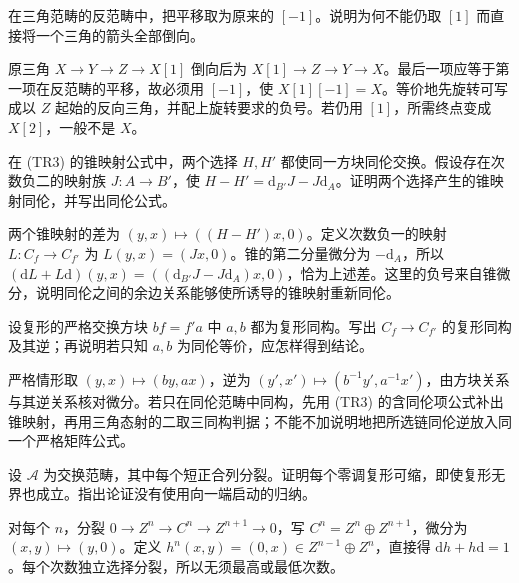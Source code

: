 \begin{exercise}\label{b4:ex:16-opposite-shift}
在三角范畴的反范畴中，把平移取为原来的 \([-1]\)。说明为何不能仍取 \([1]\) 而直接将一个三角的箭头全部倒向。
\end{exercise}
\begin{solution}
原三角 \(X\to Y\to Z\to X[1]\) 倒向后为 \(X[1]\to Z\to Y\to X\)。最后一项应等于第一项在反范畴的平移，故必须用 \([-1]\)，使 \(X[1][-1]=X\)。等价地先旋转可写成以 \(Z\) 起始的反向三角，并配上旋转要求的负号。若仍用 \([1]\)，所需终点变成 \(X[2]\)，一般不是 \(X\)。
\end{solution}

\begin{exercise}\label{b4:ex:16-different-homotopies}
在 (TR3) 的锥映射公式中，两个选择 \(H,H'\) 都使同一方块同伦交换。假设存在次数负二的映射族 \(J:A\to B'\)，使 \(H-H'=\mathrm{d}_{B'}J-J\mathrm{d}_A\)。证明两个选择产生的锥映射同伦，并写出同伦公式。
\end{exercise}
\begin{solution}
两个锥映射的差为 \((y,x)\mapsto((H-H')x,0)\)。定义次数负一的映射 \(L:C_f\to C_{f'}\) 为 \(L(y,x)=(Jx,0)\)。锥的第二分量微分为 \(-\mathrm{d}_A\)，所以 \((\mathrm{d}L+L\mathrm{d})(y,x)=((\mathrm{d}_{B'}J-J\mathrm{d}_A)x,0)\)，恰为上述差。这里的负号来自锥微分，说明同伦之间的余边关系能够使所诱导的锥映射重新同伦。
\end{solution}

\begin{exercise}\label{b4:ex:16-cone-square-iso}
设复形的严格交换方块 \(bf=f'a\) 中 \(a,b\) 都为复形同构。写出 \(C_f\to C_{f'}\) 的复形同构及其逆；再说明若只知 \(a,b\) 为同伦等价，应怎样得到结论。
\end{exercise}
\begin{solution}
严格情形取 \((y,x)\mapsto(by,ax)\)，逆为 \((y',x')\mapsto(b^{-1}y',a^{-1}x')\)，由方块关系与其逆关系核对微分。若只在同伦范畴中同构，先用 (TR3) 的含同伦项公式补出锥映射，再用三角态射的二取三同构判据；不能不加说明地把所选链同伦逆放入同一个严格矩阵公式。
\end{solution}

\begin{exercise}\label{b4:ex:16-nonsplit-semisimple}
设 \(\mathcal A\) 为交换范畴，其中每个短正合列分裂。证明每个零调复形可缩，即使复形无界也成立。指出论证没有使用向一端启动的归纳。
\end{exercise}
\begin{solution}
对每个 \(n\)，分裂 \(0\to Z^n\to C^n\to Z^{n+1}\to0\)，写 \(C^n=Z^n\oplus Z^{n+1}\)，微分为 \((x,y)\mapsto(y,0)\)。定义 \(h^n(x,y)=(0,x)\in Z^{n-1}\oplus Z^n\)，直接得 \(\mathrm{d}h+h\mathrm{d}=1\)。每个次数独立选择分裂，所以无须最高或最低次数。
\end{solution}

